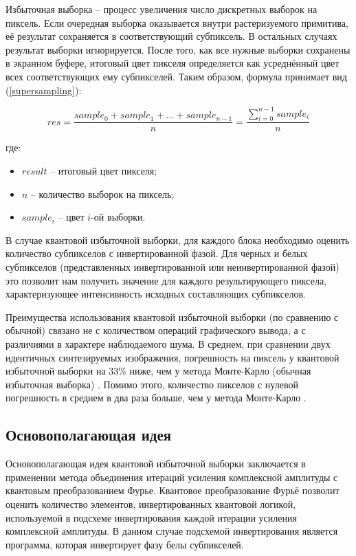 Избыточная выборка -- процесс увеличения число дискретных выборок на пиксель. Если очередная выборка оказывается внутри растеризуемого примитива, её результат сохраняется в соответствующий субпиксель. В остальных случаях результат выборки игнорируется. После того, как все нужные выборки сохранены в экранном буфере, итоговый цвет пикселя определяется как усреднённый цвет всех соответствующих ему субпикселей. Таким образом, формула принимает вид (\ref{supersampling}): 

\begin{equation}
	\label{supersampling}
	res = \frac{sample_{0} + sample_{1} + ... + sample_{n-1}}{n} = \frac{\sum_{i=0}^{n - 1} sample_{i}}{n}
\end{equation}

где:

\begin{itemize}
\item $result$ -- итоговый цвет пикселя;
\item $n$ -- количество выборок на пиксель;
\item $sample_{i}$ -- цвет $i$-ой выборки.
\end{itemize}

В случае квантовой избыточной выборки, для каждого блока необходимо оценить количество субпикселов с инвертированной фазой. Для черных и белых субпикселов (представленных инвертированной или неинвертированной фазой) это позволит нам получить значение для каждого результирующего пиксела, характеризующее интенсивность исходных составляющих субпикселов.

Преимущества использования квантовой избыточной выборки (по сравнению с обычной) связано не с количеством операций графического вывода, а с различиями в характере наблюдаемого шума. В среднем, при сравнении двух идентичных синтезируемых изображения, погрешность на пиксель у квантовой избыточной выборки на 33\% ниже, чем у метода Монте-Карло (обычная избыточная выборка) \cite{PQC}. Помимо этого, количество пикселов с нулевой погрешность в среднем в два раза больше, чем у метода Монте-Карло \cite{PQC}.

\subsection{Основополагающая идея}

Основополагающая идея квантовой избыточной выборки заключается в применении метода объединения итераций усиления комплексной амплитуды с квантовым преобразованием Фурье. Квантовое преобразование Фурьё позволит оценить количество элементов, инвертированных квантовой логикой, используемой в подсхеме инвертирования каждой итерации усиления комплексной амплитуды. В данном случае подсхемой инвертирования является программа, которая инвертирует фазу белы субпикселей.

